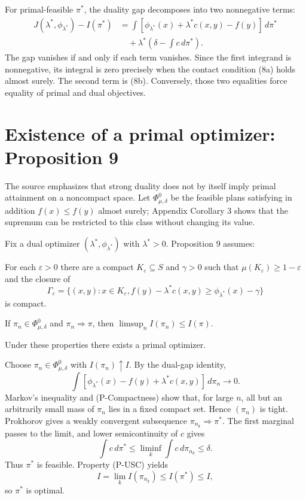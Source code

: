 For primal-feasible $\pi^*$, the duality gap decomposes into two nonnegative terms:
\begin{align*}
 J(\lambda^*,\phi_{\lambda^*})-I(\pi^*)
 &=\int[\phi_{\lambda^*}(x)+\lambda^*c(x,y)-f(y)]\,d\pi^*\\
 &\quad+\lambda^*\left(\delta-\int c\,d\pi^*\right).
\end{align*}
The gap vanishes if and only if each term vanishes.  Since the first integrand is nonnegative, its
integral is zero precisely when the contact condition (8a) holds almost surely.  The second term is
(8b).  Conversely, those two equalities force equality of primal and dual objectives.

\section{Existence of a primal optimizer: Proposition 9}
The source emphasizes that strong duality does not by itself imply primal attainment on a
noncompact space.  Let $\Phi^0_{\mu,\delta}$ be the feasible plans satisfying in addition
$f(x)\le f(y)$ almost surely; Appendix Corollary 3 shows that the supremum can be restricted to
this class without changing its value.

Fix a dual optimizer $(\lambda^*,\phi_{\lambda^*})$ with $\lambda^*>0$.  Proposition 9 assumes:
\begin{description}[style=nextline,leftmargin=3cm]
\item[(P-Compactness)] For each $\varepsilon>0$ there are a compact $K_\varepsilon\subseteq S$
and $\gamma>0$ such that $\mu(K_\varepsilon)\ge1-\varepsilon$ and the closure of
\[
 \Gamma_\varepsilon=
 \{(x,y):x\in K_\varepsilon,
   f(y)-\lambda^*c(x,y)\ge\phi_{\lambda^*}(x)-\gamma\}
\]
is compact.
\item[(P-USC)] If $\pi_n\in\Phi^0_{\mu,\delta}$ and $\pi_n\Rightarrow\pi$, then
$\limsup_n I(\pi_n)\le I(\pi)$.
\end{description}
Under these properties there exists a primal optimizer.

Choose $\pi_n\in\Phi^0_{\mu,\delta}$ with $I(\pi_n)\uparrow I$.  By the dual-gap identity,
\[
 \int[\phi_{\lambda^*}(x)-f(y)+\lambda^*c(x,y)]\,d\pi_n\to0.
\]
Markov's inequality and (P-Compactness) show that, for large $n$, all but an arbitrarily small mass
of $\pi_n$ lies in a fixed compact set.  Hence $(\pi_n)$ is tight.  Prokhorov gives a weakly
convergent subsequence $\pi_{n_k}\Rightarrow\pi^*$.  The first marginal passes to the limit, and
lower semicontinuity of $c$ gives
\[
 \int c\,d\pi^*\le\liminf_k\int c\,d\pi_{n_k}\le\delta.
\]
Thus $\pi^*$ is feasible.  Property (P-USC) yields
\[
 I=\lim_kI(\pi_{n_k})\le I(\pi^*)\le I,
\]
so $\pi^*$ is optimal.

